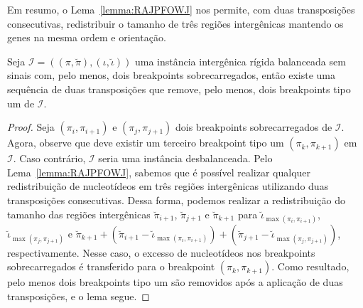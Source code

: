 Em resumo, o Lema~\ref{lemma:RAJPFOWJ} nos permite, com duas transposições consecutivas, redistribuir o tamanho de três regiões intergênicas mantendo os genes na mesma ordem e orientação.

\begin{lemma}\label{lemma:FSGHLWJU}
Seja $\mathcal{I} = ((\pi,\breve\pi),(\iota,\breve\iota))$ uma instância intergênica rígida balanceada sem sinais com, pelo menos, dois breakpoints sobrecarregados, então existe uma sequência de duas transposições que remove, pelo menos, dois breakpoints tipo um de $\mathcal{I}$.
\end{lemma}
\begin{proof}
Seja $(\pi_i,\pi_{i+1})$ e $(\pi_j,\pi_{j+1})$ dois breakpoints sobrecarregados de $\mathcal{I}$.
Agora, observe que deve existir um terceiro breakpoint tipo um $(\pi_k,\pi_{k+1})$ em $\mathcal{I}$. Caso contrário, $\mathcal{I}$ seria uma instância desbalanceada. Pelo Lema~\ref{lemma:RAJPFOWJ}, sabemos que é possível realizar qualquer redistribuição de nucleotídeos em três regiões intergênicas utilizando duas transposições consecutivas. Dessa forma, podemos realizar a redistribuição do tamanho das regiões intergênicas $\breve\pi_{i+1}$, $\breve\pi_{j+1}$ e $\breve\pi_{k+1}$ para $\breve\iota_{\max(\pi_i,\pi_{i+1})}$, $\breve\iota_{\max(\pi_j,\pi_{j+1})}$ e $\breve\pi_{k+1} + (\breve\pi_{i+1} - \breve\iota_{\max(\pi_i,\pi_{i+1})}) + (\breve\pi_{j+1} - \breve\iota_{\max(\pi_j,\pi_{j+1})})$, respectivamente. Nesse caso, o excesso de nucleotídeos nos breakpoints sobrecarregados é transferido para o breakpoint $(\pi_k,\pi_{k+1})$. Como resultado, pelo menos dois breakpoints tipo um são removidos após a aplicação de duas transposições, e o lema segue.
\end{proof}

